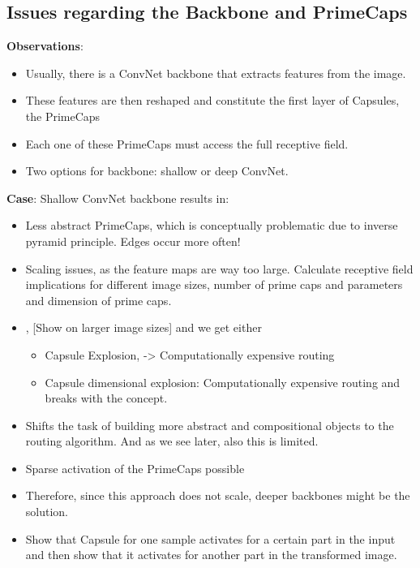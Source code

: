 \documentclass{article}
\begin{document}
\subsection{Issues regarding the Backbone and PrimeCaps}
\textbf{Observations}:
\begin{itemize}
	\item Usually, there is a ConvNet backbone that extracts features from the image.
	\item These features are then reshaped and constitute the first layer of Capsules, the PrimeCaps
	\item Each one of these PrimeCaps must access the full receptive field.
	\item Two options for backbone: shallow or deep ConvNet.
\end{itemize}
\textbf{Case}: Shallow ConvNet backbone results in:
\begin{itemize}
	\item Less abstract PrimeCaps, which is conceptually problematic due to inverse pyramid principle. Edges occur more often! 
	\item Scaling issues, as the feature maps are way too large. Calculate receptive field implications for different image sizes, number of prime caps and parameters and dimension of prime caps.
	\item, [Show on larger image sizes] and we get either
	\begin{itemize}
		\item Capsule Explosion, -> Computationally expensive routing %
		\item Capsule dimensional explosion: Computationally expensive routing and breaks with the concept.
	\end{itemize}
	\item Shifts the task of building more abstract and compositional objects to the routing algorithm. And as we see later, also this is limited.
	\item Sparse activation of the PrimeCaps possible
	\item Therefore, since this approach does not scale, deeper backbones might be the solution.
	\item Show that Capsule for one sample activates for a certain part in the input and then show that it activates for another part in the transformed image.
\end{itemize}
\end{document}
